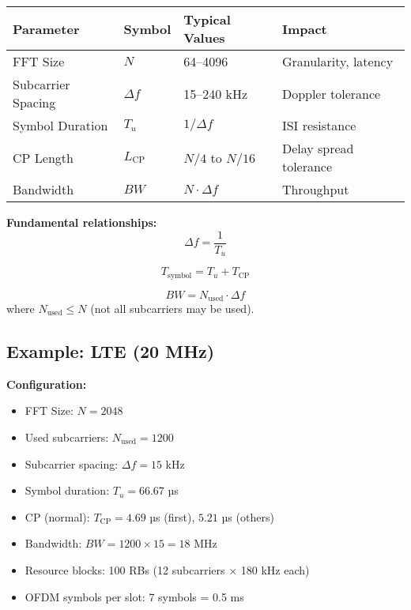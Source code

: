 \begin{center}
\begin{tabular}{@{}llll@{}}
\toprule
\textbf{Parameter} & \textbf{Symbol} & \textbf{Typical Values} & \textbf{Impact} \\
\midrule
FFT Size & $N$ & 64--4096 & Granularity, latency \\
Subcarrier Spacing & $\Delta f$ & 15--240 kHz & Doppler tolerance \\
Symbol Duration & $T_u$ & $1/\Delta f$ & ISI resistance \\
CP Length & $L_{\mathrm{CP}}$ & $N/4$ to $N/16$ & Delay spread tolerance \\
Bandwidth & $BW$ & $N \cdot \Delta f$ & Throughput \\
\bottomrule
\end{tabular}
\end{center}

\textbf{Fundamental relationships:}
\begin{equation}
\Delta f = \frac{1}{T_u}
\end{equation}

\begin{equation}
T_{\mathrm{symbol}} = T_u + T_{\mathrm{CP}}
\end{equation}

\begin{equation}
BW = N_{\mathrm{used}} \cdot \Delta f
\end{equation}
where $N_{\mathrm{used}} \leq N$ (not all subcarriers may be used).

\subsection{Example: LTE (20 MHz)}

\textbf{Configuration:}
\begin{itemize}
\item FFT Size: $N = 2048$
\item Used subcarriers: $N_{\mathrm{used}} = 1200$
\item Subcarrier spacing: $\Delta f = 15$ kHz
\item Symbol duration: $T_u = 66.67$ µs
\item CP (normal): $T_{\mathrm{CP}} = 4.69$ µs (first), $5.21$ µs (others)
\item Bandwidth: $BW = 1200 \times 15 = 18$ MHz
\item Resource blocks: 100 RBs (12 subcarriers $\times$ 180 kHz each)
\item OFDM symbols per slot: 7 symbols = 0.5 ms
\end{itemize}


